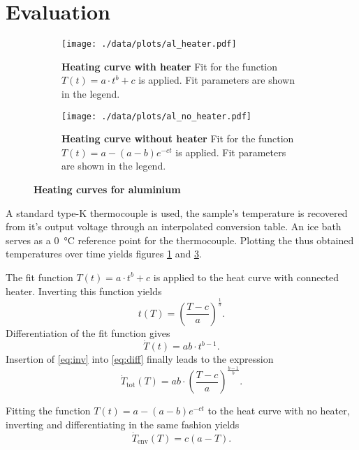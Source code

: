 \section{Evaluation}
\begin{figure}[tbp]
	\centering
	\begin{subfigure}{.45\textwidth}
		\centering
		\texttt{[image: ./data/plots/al\_heater.pdf]}
		\caption[Heating curve with heater]{\textbf{Heating curve with heater} Fit for the function $T(t)=a\cdot t^b + c$ is applied. Fit parameters are shown in the legend.}
		\label{fig:heater}
	\end{subfigure}
	\quad
	\begin{subfigure}{.45\textwidth}
		\centering
		\texttt{[image: ./data/plots/al\_no\_heater.pdf]}
		\caption[Heating curve without heater]{\textbf{Heating curve without heater} Fit for the function $T(t)=a - (a-b)e^{-ct}$ is applied. Fit parameters are shown in the legend.}
		\label{fig:no_heater}
	\end{subfigure}
	\caption[Heating curves for aluminium]{\textbf{Heating curves for aluminium}}
\end{figure}

A standard type-K thermocouple is used, the sample's temperature is recovered from it's output voltage through an interpolated conversion table.
An ice bath serves as a \SI{0}{\celsius} reference point for the thermocouple.
Plotting the thus obtained temperatures over time yields figures \ref{fig:heater} and \ref{fig:no_heater}.

The fit function $T(t)=a\cdot t^b + c$ is applied to the heat curve with connected heater.
Inverting this function yields
\begin{equation}\label{eq:inv}
	t(T) = \left(\frac{T-c}{a}\right)^\frac{1}{b}.
\end{equation}
Differentiation of the fit function gives
\begin{equation}\label{eq:diff}
	\dot{T}(t) = ab\cdot t^{b-1}.
\end{equation}
Insertion of \autoref{eq:inv} into \autoref{eq:diff} finally leads to the expression
\begin{equation*}
	\dot{T}_\text{tot}(T) = ab\cdot\left(\frac{T-c}{a}\right)^{\frac{b-1}{b}}.
\end{equation*}

Fitting the function $T(t)=a - (a-b)e^{-ct}$ to the heat curve with no heater, inverting and differentiating in the same fashion yields
\begin{equation*}
	\dot{T}_\text{env}(T) = c(a-T).
\end{equation*}


